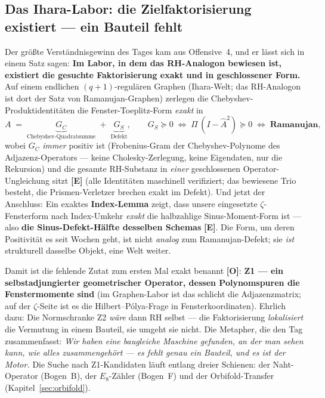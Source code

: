 \documentclass[11pt,a4paper]{article}
\newcommand{\E}{\textcolor{gut}{\textbf{[E]}}}
\newcommand{\OO}{\textcolor{offen}{\textbf{[O]}}}
\begin{document}
\subsection*{Das Ihara-Labor: die Zielfaktorisierung existiert ---
ein Bauteil fehlt}

Der größte Verständnisgewinn des Tages kam aus Offensive~4, und er
lässt sich in einem Satz sagen: \textbf{Im Labor, in dem das
RH-Analogon bewiesen ist, existiert die gesuchte Faktorisierung
exakt und in geschlossener Form.} Auf einem endlichen
$(q{+}1)$-regulären Graphen (Ihara-Welt; das RH-Analogon ist dort
der Satz von Ramanujan-Graphen) zerlegen die
Chebyshev-Produktidentitäten die Fenster-Toeplitz-Form \emph{exakt}
in
\[
A \;=\; \underbrace{G_C}_{\text{Chebyshev-Quadratsumme}}
\;+\; \underbrace{G_S}_{\text{Defekt}},
\qquad
G_S \succeq 0 \;\Longleftrightarrow\; \Pi\,(I - \hat A^2) \succeq 0
\;\Longleftrightarrow\; \textbf{Ramanujan},
\]
wobei $G_C$ \emph{immer} positiv ist (Frobenius-Gram der
Chebyshev-Polynome des Adjazenz-Operators --- keine Cholesky-Zerlegung,
keine Eigendaten, nur die Rekursion) und die gesamte RH-Substanz in
\emph{einer} geschlossenen Operator-Ungleichung sitzt \E{} (alle
Identitäten maschinell verifiziert; das bewiesene Trio besteht, die
Prismen-Verletzer brechen exakt im Defekt). Und jetzt der Anschluss:
Ein exaktes \textbf{Index-Lemma} zeigt, dass unsere eingesetzte
$\zeta$-Fensterform nach Index-Umkehr \emph{exakt} die
halbzahlige Sinus-Moment-Form ist --- also \textbf{die
Sinus-Defekt-Hälfte desselben Schemas} \E{}. Die Form, um deren
Positivität es seit Wochen geht, ist nicht \emph{analog} zum
Ramanujan-Defekt; sie \emph{ist} strukturell dasselbe Objekt, eine
Welt weiter.

Damit ist die fehlende Zutat zum ersten Mal exakt benannt \OO{}:
\textbf{Z1 --- ein selbstadjungierter geometrischer Operator, dessen
Polynomspuren die Fenstermomente sind} (im Graphen-Labor ist das
schlicht die Adjazenzmatrix; auf der $\zeta$-Seite ist es die
Hilbert--Pólya-Frage in Fensterkoordinaten). Ehrlich dazu: Die
Normschranke Z2 \emph{wäre} dann RH selbst --- die Faktorisierung
\emph{lokalisiert} die Vermutung in einem Bauteil, sie umgeht sie
nicht. Die Metapher, die den Tag zusammenfasst: \emph{Wir haben eine
baugleiche Maschine gefunden, an der man sehen kann, wie alles
zusammengehört --- es fehlt genau ein Bauteil, und es ist der
Motor.} Die Suche nach Z1-Kandidaten läuft entlang dreier Schienen:
der Naht-Operator (Bogen~B), der $E_8$-Zähler (Bogen~F) und der
Orbifold-Transfer (Kapitel~\ref{sec:orbifold}).
\end{document}
